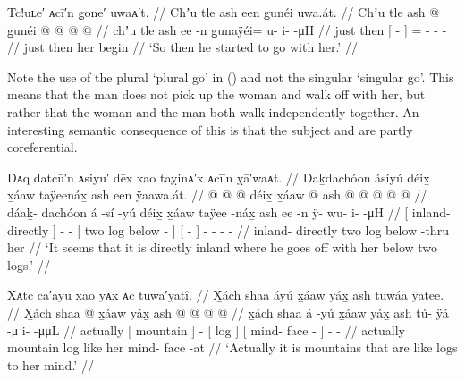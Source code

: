 \ex\label{ex:89-16-he-started-off-with-her}%
%
\begingl
	\glpreamble	Tc!uʟe′ ᴀcī′n g̣one′ uwaᴀ′t. //
	\glpreamble	Chʼu tle ash een g̱unéi uwa.át. //
	\gla	Chʼu tle {} ash  @ {} {}
		g̱unéi @  @ {} @ {} @ {} //
	\glb	chʼu tle {} ash ee -n {}
		g̱unaÿéi= u- i-  -μH //
	\glc	just then {}[   - {}]
		= - -  - //
	\gld	just then {} her  {} {}
		begin  {} {} {} //
	\glft	‘So then he started to go with her.’
		//
\endgl
\xe

Note the use of the plural  ‘plural go’ in (\lastx) and not the singular  ‘singular go’.
This means that the man does not pick up the woman and walk off with her, but rather that the woman and the man both walk independently together.
An interesting semantic consequence of this is that the subject and  are partly coreferential.

\ex\label{ex:89-17-went-off-inland}%
%
\begingl
	\glpreamble	Dᴀq datcū′n ᴀsiyu′ dēx xao taỵinᴀ′x ᴀcī′n ỵā′waᴀt. //
	\glpreamble	Daḵdachóon ásíyú déix̱ x̱áaw taÿeenáx̱ ash een ÿaawa.át. //
	\gla	{}  @ {} {}
		 @ {} @ {}
		{} déix̱ x̱áaw  @ {} {}
		{} ash  @ {} {}
		 @ {} @ {} @ {} @ {} //
	\glb	{} dáaḵ- dachóon {}
		á -sí -yú
		{} déix̱ x̱áaw taÿee -náx̱ {}
		{} ash ee -n {}
		ÿ- wu- i-  -μH //
	\glc	{}[ inland- directly {}]
		 - -
		{}[ two log below - {}]
		{}[   - {}]
		- - -  - //
	\gld	{} inland- directly {}
		 {} {}
		{} two log below -thru {}
		{} her  {} {}
		 {} {} {} {} //
	\glft	‘It seems that it is directly inland where he goes off with her below two logs.’
		//
\endgl
\xe

\ex\label{ex:89-18-actually-mountains}%
%
\begingl
	\glpreamble	Xᴀtc cā′ayu xao yᴀx ᴀc tuwā′ỵatî. //
	\glpreamble	X̱ách shaa áyú x̱áaw yáx̱ ash tuwáa ÿatee. //
	\gla	X̱ách {} shaa {}  @ {}
		{} x̱áaw yáx̱ {}
		{} ash  @ {} @ {} {}
		 @ {} @ {} //
	\glb	x̱ách {} shaa {} á -yú
		{} x̱áaw yáx̱ {}
		{} ash tú- ÿá -μ {}
		i-  -μμL //
	\glc	actually {}[ mountain {}]  -
		{}[ log  {}]
		{}[  mind- face - {}]
		-  - //
	\gld	actually {} mountain {}  {}
		{} log like {}
		{} her mind- face -at {}
		 {} {} //
	\glft	‘Actually it is mountains that are like logs to her mind.’
		//
\endgl
\xe

